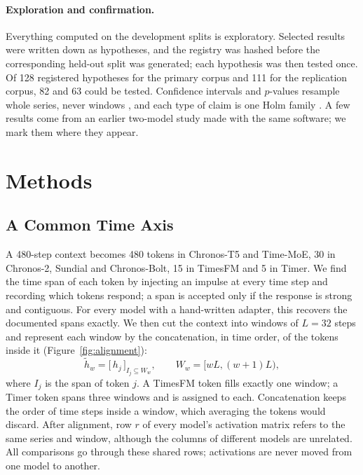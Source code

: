 \documentclass[twoside,11pt]{article}
\begin{document}
\paragraph{Exploration and confirmation.}
\label{sec:confirmation}
Everything computed on the development splits is exploratory.
Selected results were written down as hypotheses, and the registry was hashed before the corresponding held-out split was generated; each hypothesis was then tested once.
Of 128 registered hypotheses for the primary corpus and 111 for the replication corpus, 82 and 63 could be tested.
Confidence intervals and $p$-values resample whole series, never windows \citep{efron1993bootstrap,cameron2008cluster}, and each type of claim is one Holm family \citep{holm1979}.
A few results come from an earlier two-model study made with the same software; we mark them where they appear.

\section{Methods}
\label{sec:methods}

\subsection{A Common Time Axis}
\label{sec:alignment}

A 480-step context becomes 480 tokens in Chronos-T5 and Time-MoE, 30 in Chronos-2, Sundial and Chronos-Bolt, 15 in TimesFM and 5 in Timer.
We find the time span of each token by injecting an impulse at every time step and recording which tokens respond; a span is accepted only if the response is strong and contiguous.
For every model with a hand-written adapter, this recovers the documented spans exactly.
We then cut the context into windows of $L=32$ steps and represent each window by the concatenation, in time order, of the tokens inside it (Figure~\ref{fig:alignment}):
\begin{equation}
\tilde h_w = \big[\,h_j\,\big]_{I_j\subseteq W_w}, \qquad W_w=[wL,(w+1)L),
\label{eq:pooling}
\end{equation}
where $I_j$ is the span of token $j$.
A TimesFM token fills exactly one window; a Timer token spans three windows and is assigned to each.
Concatenation keeps the order of time steps inside a window, which averaging the tokens would discard.
After alignment, row $r$ of every model's activation matrix refers to the same series and window, although the columns of different models are unrelated.
All comparisons go through these shared rows; activations are never moved from one model to another.
\end{document}
